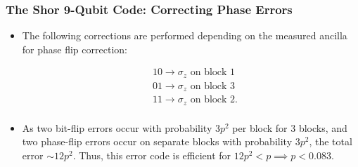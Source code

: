 \documentclass{beamer}
\begin{document}
\begin{frame}
    \frametitle{The Shor 9-Qubit Code: Correcting Phase Errors}
        \begin{itemize}
            \item The following corrections are performed depending on the measured ancilla for phase flip correction:
            
            \begin{align*}
            &10 \rightarrow \sigma_z \text{ on block 1}\\
            &01 \rightarrow \sigma_z \text{ on block 3}\\
            &11 \rightarrow \sigma_z \text{ on block 2}.\\
           \end{align*}
           
           \item As two bit-flip errors occur with probability $3p^2$ per block for 3 blocks, and two phase-flip errors occur on separate blocks with probability $3p^2$, the total error $\sim 12p^2$. Thus, this error code is efficient for $12p^2 < p \implies p < 0.083$.
            
        \end{itemize}
\end{frame}
\end{document}
